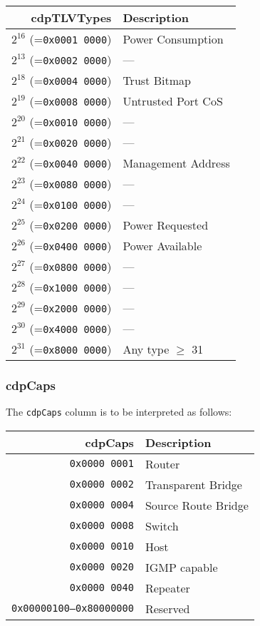 \documentclass[documentation]{subfiles}
\begin{document}
\begin{minipage}{.45\textwidth}
    \begin{longtable}{rl}
        \toprule
        {\bf cdpTLVTypes} & {\bf Description}\\
        \midrule\endhead%
        $2^{16}$ (={\tt 0x0001 0000}) & Power Consumption\\
        $2^{13}$ (={\tt 0x0002 0000}) & ---\\
        $2^{18}$ (={\tt 0x0004 0000}) & Trust Bitmap\\
        $2^{19}$ (={\tt 0x0008 0000}) & Untrusted Port CoS\\
        $2^{20}$ (={\tt 0x0010 0000}) & ---\\
        $2^{21}$ (={\tt 0x0020 0000}) & ---\\
        $2^{22}$ (={\tt 0x0040 0000}) & Management Address\\
        $2^{23}$ (={\tt 0x0080 0000}) & ---\\
        $2^{24}$ (={\tt 0x0100 0000}) & ---\\
        $2^{25}$ (={\tt 0x0200 0000}) & Power Requested\\
        $2^{26}$ (={\tt 0x0400 0000}) & Power Available\\
        $2^{27}$ (={\tt 0x0800 0000}) & ---\\
        $2^{28}$ (={\tt 0x1000 0000}) & ---\\
        $2^{29}$ (={\tt 0x2000 0000}) & ---\\
        $2^{30}$ (={\tt 0x4000 0000}) & ---\\
        $2^{31}$ (={\tt 0x8000 0000}) & Any type $\geq$ 31\\
        \bottomrule
    \end{longtable}
\end{minipage}

\subsubsection{cdpCaps}\label{cdpCaps}
The {\tt cdpCaps} column is to be interpreted as follows:
\begin{longtable}{rl}
    \toprule
    {\bf cdpCaps} & {\bf Description}\\
    \midrule\endhead%
    {\tt 0x0000 0001} & Router\\
    {\tt 0x0000 0002} & Transparent Bridge\\
    {\tt 0x0000 0004} & Source Route Bridge\\
    {\tt 0x0000 0008} & Switch\\
    {\tt 0x0000 0010} & Host\\
    {\tt 0x0000 0020} & IGMP capable\\
    {\tt 0x0000 0040} & Repeater\\
    {\tt 0x00000100--0x80000000} & Reserved\\
    \bottomrule
\end{longtable}
\end{document}
